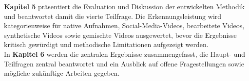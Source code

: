 \textbf{Kapitel 5} präsentiert die Evaluation und Diskussion der entwickelten Methodik und beantwortet damit die vierte Teilfrage. Die Erkennungsleistung wird kategorienweise für native Aufnahmen, Social-Media-Videos, bearbeitete Videos, synthetische Videos sowie gemischte Videos ausgewertet, bevor die Ergebnisse kritisch gewürdigt und methodische Limitationen aufgezeigt werden.\\

In \textbf{Kapitel 6} werden die zentralen Ergebnisse zusammengefasst, die Haupt- und Teilfragen zentral beantwortet und ein Ausblick auf offene Fragestellungen sowie mögliche zukünftige Arbeiten gegeben.